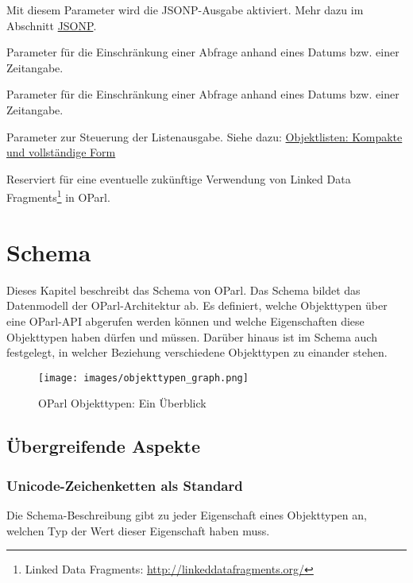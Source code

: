 \documentclass[,a4paper]{article}
\makeatletter
\def\maxwidth{\ifdim\Gin@nat@width>\linewidth\linewidth
\else\Gin@nat@width\fi}
\let\Oldincludegraphics\includegraphics
\renewcommand{\includegraphics}[1]{\Oldincludegraphics[width=\maxwidth]{#1}}
\makeatother
\begin{document}
\begin{description}
\itemsep1pt\parskip0pt
\item[\texttt{callback}:]
Mit diesem Parameter wird die JSONP-Ausgabe aktiviert. Mehr dazu im
Abschnitt \hyperref[jsonp]{JSONP}.
\item[\texttt{startdate}:]
Parameter für die Einschränkung einer Abfrage anhand eines Datums bzw.
einer Zeitangabe.
\item[\texttt{enddate}:]
Parameter für die Einschränkung einer Abfrage anhand eines Datums bzw.
einer Zeitangabe.
\item[\texttt{listformat}:]
Parameter zur Steuerung der Listenausgabe. Siehe dazu:
\hyperref[objektlistenux5flistformat]{Objektlisten: Kompakte und
vollständige Form}
\item[\texttt{subject}, \texttt{predicate}, \texttt{object}:]
Reserviert für eine eventuelle zukünftige Verwendung von Linked Data
Fragments\footnote{Linked Data Fragments:
  \url{http://linkeddatafragments.org/}} in OParl.
\end{description}

\section{Schema}\label{schema}

Dieses Kapitel beschreibt das Schema von OParl. Das Schema bildet das
Datenmodell der OParl-Architektur ab. Es definiert, welche Objekttypen
über eine OParl-API abgerufen werden können und welche Eigenschaften
diese Objekttypen haben dürfen und müssen. Darüber hinaus ist im Schema
auch festgelegt, in welcher Beziehung verschiedene Objekttypen zu
einander stehen.

\begin{figure}[htbp]
\centering
\texttt{[image: images/objekttypen\_graph.png]}
\caption{OParl Objekttypen: Ein Überblick}
\end{figure}

\subsection{Übergreifende Aspekte}\label{uxfcbergreifende-aspekte}

\subsubsection{Unicode-Zeichenketten als
Standard}\label{unicodeux5fzeichenketten}

Die Schema-Beschreibung gibt zu jeder Eigenschaft eines Objekttypen an,
welchen Typ der Wert dieser Eigenschaft haben muss.
\end{document}
